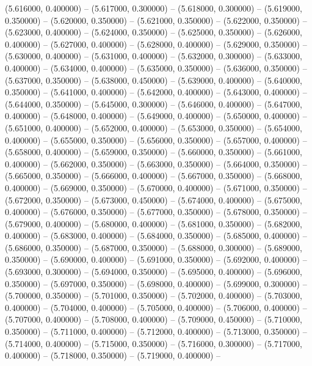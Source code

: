 (5.616000, 0.400000) -- 
(5.617000, 0.300000) -- 
(5.618000, 0.300000) -- 
(5.619000, 0.350000) -- 
(5.620000, 0.350000) -- 
(5.621000, 0.350000) -- 
(5.622000, 0.350000) -- 
(5.623000, 0.400000) -- 
(5.624000, 0.350000) -- 
(5.625000, 0.350000) -- 
(5.626000, 0.400000) -- 
(5.627000, 0.400000) -- 
(5.628000, 0.400000) -- 
(5.629000, 0.350000) -- 
(5.630000, 0.400000) -- 
(5.631000, 0.400000) -- 
(5.632000, 0.300000) -- 
(5.633000, 0.400000) -- 
(5.634000, 0.400000) -- 
(5.635000, 0.350000) -- 
(5.636000, 0.350000) -- 
(5.637000, 0.350000) -- 
(5.638000, 0.450000) -- 
(5.639000, 0.400000) -- 
(5.640000, 0.350000) -- 
(5.641000, 0.400000) -- 
(5.642000, 0.400000) -- 
(5.643000, 0.400000) -- 
(5.644000, 0.350000) -- 
(5.645000, 0.300000) -- 
(5.646000, 0.400000) -- 
(5.647000, 0.400000) -- 
(5.648000, 0.400000) -- 
(5.649000, 0.400000) -- 
(5.650000, 0.400000) -- 
(5.651000, 0.400000) -- 
(5.652000, 0.400000) -- 
(5.653000, 0.350000) -- 
(5.654000, 0.400000) -- 
(5.655000, 0.350000) -- 
(5.656000, 0.350000) -- 
(5.657000, 0.400000) -- 
(5.658000, 0.400000) -- 
(5.659000, 0.350000) -- 
(5.660000, 0.350000) -- 
(5.661000, 0.400000) -- 
(5.662000, 0.350000) -- 
(5.663000, 0.350000) -- 
(5.664000, 0.350000) -- 
(5.665000, 0.350000) -- 
(5.666000, 0.400000) -- 
(5.667000, 0.350000) -- 
(5.668000, 0.400000) -- 
(5.669000, 0.350000) -- 
(5.670000, 0.400000) -- 
(5.671000, 0.350000) -- 
(5.672000, 0.350000) -- 
(5.673000, 0.450000) -- 
(5.674000, 0.400000) -- 
(5.675000, 0.400000) -- 
(5.676000, 0.350000) -- 
(5.677000, 0.350000) -- 
(5.678000, 0.350000) -- 
(5.679000, 0.400000) -- 
(5.680000, 0.400000) -- 
(5.681000, 0.350000) -- 
(5.682000, 0.400000) -- 
(5.683000, 0.400000) -- 
(5.684000, 0.350000) -- 
(5.685000, 0.400000) -- 
(5.686000, 0.350000) -- 
(5.687000, 0.350000) -- 
(5.688000, 0.300000) -- 
(5.689000, 0.350000) -- 
(5.690000, 0.400000) -- 
(5.691000, 0.350000) -- 
(5.692000, 0.400000) -- 
(5.693000, 0.300000) -- 
(5.694000, 0.350000) -- 
(5.695000, 0.400000) -- 
(5.696000, 0.350000) -- 
(5.697000, 0.350000) -- 
(5.698000, 0.400000) -- 
(5.699000, 0.300000) -- 
(5.700000, 0.350000) -- 
(5.701000, 0.350000) -- 
(5.702000, 0.400000) -- 
(5.703000, 0.400000) -- 
(5.704000, 0.400000) -- 
(5.705000, 0.400000) -- 
(5.706000, 0.400000) -- 
(5.707000, 0.400000) -- 
(5.708000, 0.400000) -- 
(5.709000, 0.450000) -- 
(5.710000, 0.350000) -- 
(5.711000, 0.400000) -- 
(5.712000, 0.400000) -- 
(5.713000, 0.350000) -- 
(5.714000, 0.400000) -- 
(5.715000, 0.350000) -- 
(5.716000, 0.300000) -- 
(5.717000, 0.400000) -- 
(5.718000, 0.350000) -- 
(5.719000, 0.400000) -- 
